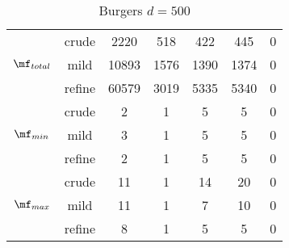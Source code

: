 \begin{table}[htb]
\begin{tabular}{ |c|c|c|c|c|c|c| }
\hline
  & crude & 2220 & 518 & 422 & 445 & 0 \\
 $\mf_{total}$  & mild & 10893 & 1576 & 1390 & 1374 & 0 \\
  & refine & 60579 & 3019 & 5335 & 5340 & 0 \\
\hline
  & crude & 2 & 1 & 5 & 5 & 0 \\
 $\mf_{min}$  & mild & 3 & 1 & 5 & 5 & 0 \\
  & refine & 2 & 1 & 5 & 5 & 0 \\
\hline
  & crude & 11 & 1 & 14 & 20 & 0 \\
 $\mf_{max}$  & mild & 11 & 1 & 7 & 10 & 0 \\
  & refine & 8 & 1 & 5 & 5 & 0 \\
\hline
\end{tabular}
\caption{ Burgers $d=500$ }
\end{table}
